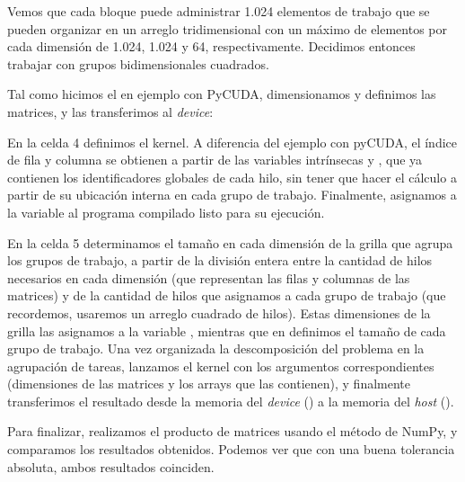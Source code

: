 Vemos que cada bloque puede administrar 1.024 elementos de trabajo que se pueden organizar en un arreglo tridimensional con un máximo de elementos por cada dimensión de 1.024, 1.024 y 64, respectivamente. Decidimos entonces trabajar con grupos bidimensionales cuadrados.

Tal como hicimos el en ejemplo con PyCUDA, dimensionamos y definimos las matrices, y las transferimos al \textit{device}:


En la celda 4 definimos el kernel. A diferencia del ejemplo con pyCUDA, el índice de fila y columna se obtienen a partir de las variables intrínsecas  y , que ya contienen los identificadores globales de cada hilo, sin tener que hacer el cálculo a partir de su ubicación interna en cada grupo de trabajo. Finalmente, asignamos a la variable  al programa compilado listo para su ejecución.
 


En la celda 5 determinamos el tamaño en cada dimensión de la grilla que agrupa los grupos de trabajo, a partir de la división entera entre la cantidad de hilos necesarios en cada dimensión (que representan las filas y columnas de las matrices) y de la cantidad de hilos que asignamos a cada grupo de trabajo (que recordemos, usaremos un arreglo cuadrado de hilos). Estas dimensiones de la grilla las asignamos a la variable , mientras que en  definimos el tamaño de cada grupo de trabajo. Una vez organizada la descomposición del problema en la agrupación de tareas, lanzamos el kernel con los argumentos correspondientes (dimensiones de las matrices y los arrays que las contienen), y finalmente transferimos el resultado desde la memoria del \textit{device} () a la memoria del \textit{host} ().


Para finalizar, realizamos el producto de matrices usando el método  de NumPy, y comparamos los resultados obtenidos. Podemos ver que con una buena tolerancia absoluta, ambos resultados coinciden.




